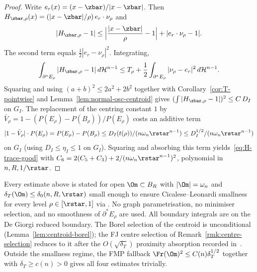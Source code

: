 \begin{proof}
Write $e_r(x)=(x-\zbar)/|x-\zbar|$. Then
$H_{\zbar,\rho}(x)=(|x-\zbar|/\rho)\,e_r\cdot\nu_\rho$ and
\[
   |H_{\zbar,\rho}-1|
   \le\Bigl|\frac{|x-\zbar|}{\rho}-1\Bigr|+|e_r\cdot\nu_\rho-1|.
\]
The second term equals $\tfrac12|e_r-\nu_\rho|^2$. Integrating,
\[
   \int_{\partial^*E_\rho}|H_{\zbar,\rho}-1|\,d\mathcal H^{n-1}
   \le T_\rho+\frac12\int_{\partial^*E_\rho}|\nu_\rho-e_r|^2\,d\mathcal H^{n-1}.
\]
Squaring and using $(a+b)^2\le2a^2+2b^2$ together with
Corollary~\ref{cor:T-pointwise} and Lemma~\ref{lem:normal-osc-centroid}
gives
$(\int|H_{\zbar,\rho}-1|)^2\le C\,D_I$ on $G_I$. The replacement of
the centring constant $1$ by $\bar V_\rho=1-(P(E_\rho)-P(B_\rho))/P(E_\rho)$
costs an additive term
\[
   |1-\bar V_\rho|\cdot P(E_\rho)=P(E_\rho)-P(B_\rho)
   \le D_I(t(\rho))/(n\omega_n\rstar^{n-1})\le D_I^{1/2}/(n\omega_n\rstar^{n-1})
\]
on $G_I$ (using $D_I\le\eta_I\le1$ on $G_I$). Squaring and absorbing
this term yields~\eqref{eq:H-trace-good} with
$C_6=2(C_5+C_3)+2/(n\omega_n\rstar^{n-1})^2$, polynomial in $n,R,1/\rstar$.
\end{proof}

\begin{remark}\label{rmk:hypothesis-tracking}
Every estimate above is stated for open $\Om\subset B_R$ with
$|\Om|=\omega_n$ and $\delta_T(\Om)\le\delta_0(n,R,\rstar)$ small enough
to ensure Cicalese--Leonardi smallness for every level
$\rho\in[\rstar,1]$ via \cite[Thm.~1.1]{CL2012}. No graph
parametrisation, no minimiser selection, and no smoothness of
$\partial^*E_\rho$ are used. All boundary integrals are on the De Giorgi
reduced boundary. The Borel selection of the centroid is unconditional
(Lemma~\ref{lem:centroid-borel}); the FJ centre selection of
Remark~\ref{rmk:centre-selection} reduces to it after the
$O(\sqrt{\delta_T})$ proximity absorption recorded in~\cite[Thm.~1.1]{FJ2014}.
Outside the smallness regime, the FMP fallback
$\Fr(\Om)^2\le C(n)\delta_T^{1/2}$ together with $\delta_T\ge c(n)>0$
gives all four estimates trivially.
\end{remark}

